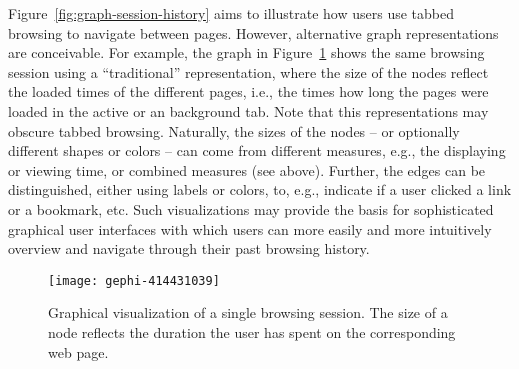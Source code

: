 \documentclass[11pt,fleqn,twoside]{article}
\begin{document}
Figure~\ref{fig:graph-session-history} aims to illustrate how users use tabbed browsing to navigate between pages. However, alternative graph representations are conceivable. For example, the graph in Figure~\ref{fig:gephi-example} shows the same browsing session using a ``traditional'' representation, where the size of the nodes reflect the loaded times of the different pages, i.e., the times how long the pages were loaded in the active or an background tab. Note that this representations may obscure tabbed browsing. Naturally, the sizes of the nodes -- or optionally different shapes or colors -- can come from different measures, e.g., the displaying or viewing time, or combined measures (see above). Further, the edges can be distinguished, either using labels or colors, to, e.g., indicate if a user clicked a link or a bookmark, etc. Such visualizations may provide the basis for sophisticated graphical user interfaces with which users can more easily and more intuitively overview and navigate through their 
past browsing history.
\begin{figure}
 \centering
 \texttt{[image: gephi-414431039]}
 \caption{Graphical visualization of a single browsing session. The size of a node reflects the duration the user has spent on the corresponding web page.}
 \label{fig:gephi-example}
\end{figure}
\end{document}
